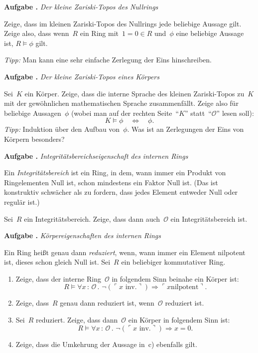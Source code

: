 \documentclass[a4paper,ngerman,12pt]{scrartcl}
\theoremstyle{definition}
\theoremstyle{plain}
\theoremstyle{remark}
\renewcommand{\O}{\mathcal{O}}
\renewcommand{\_}{\mathpunct{.}\,}
\newcommand{\?}{\,{:}\,}
\newcommand{\speak}[1]{\ulcorner\text{#1}\urcorner}
\newlength{\aufgabenskip}
\newcounter{aufgabennummer}
\newenvironment{aufgabe}[1]{
  \addtocounter{aufgabennummer}{1}
  \textbf{Aufgabe \theaufgabennummer{}.} \emph{#1} \par
}{\vspace{\aufgabenskip}}
\begin{document}
\begin{aufgabe}{Der kleine Zariski-Topos des Nullrings}
Zeige, dass im kleinen Zariski-Topos des Nullrings jede beliebige Aussage gilt.
Zeige also, dass wenn~$R$ ein Ring mit~$1 = 0 \in R$ und~$\phi$ eine beliebige
Aussage ist, $R \models \phi$ gilt.

\emph{Tipp:} Man kann eine sehr einfache Zerlegung der Eins hinschreiben.
\end{aufgabe}

\begin{aufgabe}{Der kleine Zariski-Topos eines Körpers}
Sei~$K$ ein Körper. Zeige, dass die interne Sprache des kleinen Zariski-Topos
zu~$K$ mit der gewöhnlichen mathematischen Sprache zusammenfällt. Zeige also
für beliebige Aussagen~$\phi$ (wobei man auf der rechten Seite~"`$K$"'
statt~"`$\O$"' lesen soll):
\[ K \models \phi \quad\Longleftrightarrow\quad \phi. \]
\emph{Tipp:} Induktion über den Aufbau von~$\phi$. Was ist an Zerlegungen der
Eins von Körpern besonders?
\end{aufgabe}

\begin{aufgabe}{Integritätsbereichseigenschaft des internen Rings}
Ein \emph{Integritätsbereich} ist ein Ring, in dem, wann immer ein Produkt von
Ringelementen Null ist, schon mindestens ein Faktor Null ist. (Das ist
konstruktiv schwächer als zu fordern, dass jedes Element entweder Null oder
regulär ist.)

Sei~$R$ ein Integritätsbereich. Zeige, dass dann auch~$\O$ ein
Integritätsbereich ist.
\end{aufgabe}

\enlargethispage{1.0cm}
\begin{aufgabe}{Körpereigenschaften des internen Rings}
Ein Ring heißt genau dann \emph{reduziert}, wenn, wann immer ein Element
nilpotent ist, dieses schon gleich Null ist.
Sei~$R$ ein beliebiger kommutativer Ring.
\begin{enumerate}
\item Zeige, dass der interne Ring~$\O$ in folgendem Sinn beinahe ein Körper
ist:
\[ R \models \forall x\?\O\_ \neg(\speak{$x$ inv.}) \Rightarrow \speak{$x$
nilpotent}. \]
\vspace*{-1.8em}%
\item Zeige, dass~$R$ genau dann reduziert ist, wenn~$\O$ reduziert ist.
\item Sei~$R$ reduziert. Zeige, dass dann~$\O$ ein Körper in folgendem Sinn
ist:
\[ R \models \forall x\?\O\_ \neg(\speak{$x$ inv.}) \Rightarrow x = 0. \]
\vspace*{-1.8em}%
\item Zeige, dass die Umkehrung der Aussage in~c) ebenfalls gilt.
\end{enumerate}
\end{aufgabe}
\end{document}
